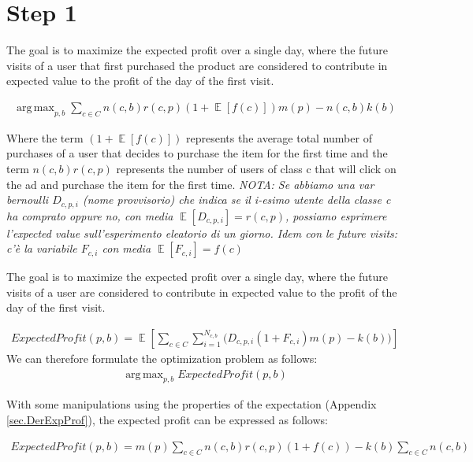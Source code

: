 \documentclass[11pt]{article} %
\DeclareMathOperator{\EX}{\mathbb{E}}
\DeclareMathOperator*{\argmax}{arg\,max}
\begin{document}
\section{Step 1}
{\color{red}
The goal is to maximize the expected profit over a single day, where the future visits of a user that first purchased the product are considered to contribute in expected value to the profit of the day of the first visit.

\begin{align*}
\argmax_{p,b}{\sum_{c \in C}{n(c,b)r(c,p)(1+\EX[f(c)])m(p)-n(c,b)k(b)}}
\end{align*}

Where the term $(1+\EX[f(c)])$ represents the average total number of purchases of a user that decides to purchase the item for the first time and the term $n(c,b)r(c,p)$ represents the number of users of class c that will click on the ad and purchase the item for the first time.
\newline
\newline
\textit{NOTA: Se abbiamo una var bernoulli $D_{c,p,i}$ (nome provvisorio) che indica se il i-esimo utente della classe c ha comprato oppure no, con media $\EX[D_{c,p,i}]=r(c,p)$, possiamo esprimere l'expected value sull'esperimento eleatorio di un giorno.
Idem con le future visits: c'è la variabile $F_{c,i}$ con media $\EX[F_{c,i}]=f(c)$}
}
\newline
\newline
The goal is to maximize the expected profit over a single day, where the future visits of a user are considered to contribute in expected value to the profit of the day of the first visit.

\begin{align*}
ExpectedProfit(p,b) = \EX\left[\sum_{c \in C}{\sum_{i =1}^{N_{c,b}}{\bigg( D_{c,p,i}(1+F_{c,i})m(p)-k(b)\bigg)}}\right]
\end{align*}
We can therefore formulate the optimization problem as follows:
\begin{align*}
\argmax_{p,b}{ExpectedProfit(p,b)}
\end{align*}

With some manipulations using the properties of the expectation (Appendix \ref{sec.DerExpProf}), the expected profit can be expressed as follows:

\begin{align*}
ExpectedProfit(p,b)=m(p)\sum_{c \in C}{n(c,b)r(c,p)(1+f(c))}-k(b)\sum_{c \in C}{n(c,b)}
\end{align*}
\end{document}

